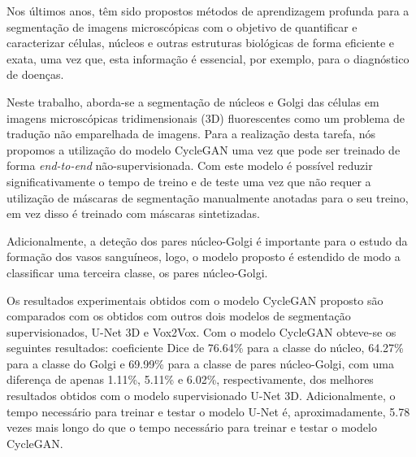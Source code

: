 \acresetall
\noindent Nos últimos anos, têm sido propostos métodos de aprendizagem profunda para a segmentação de imagens microscópicas com o objetivo de quantificar e caracterizar células, núcleos e outras estruturas biológicas de forma eficiente e exata, uma vez que, esta informação é essencial, por exemplo, para o diagnóstico de doenças.

Neste trabalho, aborda-se a segmentação de núcleos e Golgi das células em imagens microscópicas tridimensionais (3D) fluorescentes como um problema de tradução não emparelhada de imagens. Para a realização desta tarefa, nós propomos a utilização do modelo CycleGAN uma vez que pode ser treinado de forma \textit{end-to-end} não-supervisionada. Com este modelo é possível reduzir significativamente o tempo de treino e de teste uma vez que não requer a utilização de máscaras de segmentação manualmente anotadas para o seu treino, em vez disso é treinado com máscaras sintetizadas.

Adicionalmente, a deteção dos pares núcleo-Golgi é importante para o estudo da formação dos vasos sanguíneos, logo, o modelo proposto é estendido de modo a classificar uma terceira classe, os pares núcleo-Golgi.

Os resultados experimentais obtidos com o modelo CycleGAN proposto são comparados com os obtidos com outros dois modelos de segmentação supervisionados, U-Net 3D e Vox2Vox. Com o modelo CycleGAN obteve-se os seguintes resultados: coeficiente Dice de 76.64\% para a classe do núcleo, 64.27\% para a classe do Golgi e 69.99\% para a classe de pares núcleo-Golgi, com uma diferença de apenas 1.11\%, 5.11\% e 6.02\%, respectivamente, dos melhores resultados obtidos com o modelo supervisionado U-Net 3D. Adicionalmente, o tempo necessário para treinar e testar o modelo U-Net é, aproximadamente, 5.78 vezes mais longo do que o tempo necessário para treinar e testar o modelo CycleGAN.



